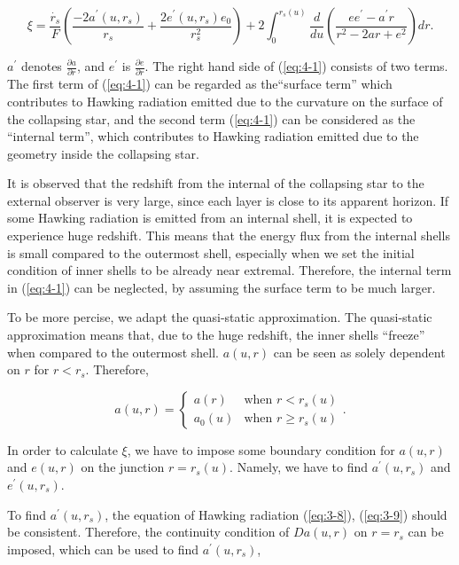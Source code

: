 \documentclass[letterpaper,12pt]{article}
\begin{document}
\begin{equation} \label{eq:4-1}
\xi = \frac{\dot{r_{s}}}{F}\left( \frac{-2a^{\prime}(u, r_{s})}{r_{s}} + \frac{2e^{\prime}(u, r_{s})e_{0}}{r_{s}^{2}}\right)+2\int^{r_{s}(u)}_{0}\frac{d}{du}\left( \frac{ee^{\prime}-a^{\prime}r}{r^{2}-2ar+e^{2}}\right)dr.
\end{equation}

$a^{\prime}$ denotes $\frac{\partial a}{\partial r}$, and $e^{\prime}$ is $ \frac{\partial e}{\partial r}$. The right hand side of (\ref{eq:4-1}) consists of two terms. The first term of (\ref{eq:4-1}) can be regarded as the``surface term'' which contributes to Hawking radiation emitted due to the curvature on the surface of the collapsing star, and the second term (\ref{eq:4-1}) can be considered as the ``internal term'', which contributes to Hawking radiation emitted due to the geometry inside the collapsing star. 

It is observed that the redshift from the internal of the collapsing star to the external observer is very large, since each layer is close to its apparent horizon. If some Hawking radiation is emitted from an internal shell, it is expected to experience huge redshift. This means that the energy flux from the internal shells is small compared to the outermost shell, especially when we set the initial condition of inner shells to be already near extremal. Therefore, the internal term in (\ref{eq:4-1}) can be neglected, by assuming the surface term to be much larger. 

To be more percise, we adapt the quasi-static approximation. The quasi-static approximation means that, due to the huge redshift, the inner shells ``freeze'' when compared to the outermost shell. $a(u, r)$ can be seen as solely dependent on $r$ for $r < r_{s}$. Therefore,

\begin{equation}\label{eq:4-10}
a(u,r) =\begin{cases}
   a(r) & \mbox{when } r < r_{s}(u) \\
  a_{0}(u)  & \mbox{when } r \geq r_{s}(u)
\end{cases}.
\end{equation}


In order to calculate $\xi$, we have to impose some boundary condition for $a(u, r)$ and $e(u,r)$ on the junction $r = r_{s}(u)$. Namely, we have to find $a^{\prime}(u, r_{s})$ and $e^{\prime}(u,r_{s})$. 


To find $a^{\prime}(u, r_{s})$, the equation of Hawking radiation (\ref{eq:3-8}), (\ref{eq:3-9}) should be consistent. Therefore, the continuity condition of $Da(u,r)$ on $r=r_{s}$ can be imposed, which can be used to find $ a^{\prime}(u, r_{s})$, 
\end{document}
